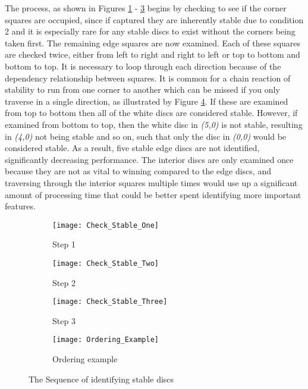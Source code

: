 \documentclass[12pt,a4paper]{article}
\begin{document}
The process, as shown in Figures \ref{fig:order_one} - \ref{fig:order_three} begins by checking to see if the corner squares are occupied, since if captured they are inherently stable due to condition 2 and it is especially rare for any stable discs to exist without the corners being taken first. The remaining edge squares are now examined. Each of these squares are checked twice, either from left to right and right to left or top to bottom and bottom to top. It is necessary to loop through each direction because of the dependency relationship between squares. It is common for a chain reaction of stability to run from one corner to another which can be missed if you only traverse in a single direction, as illustrated by Figure \ref{fig:order_example}. If these are examined from top to bottom then all of the white discs are considered stable. However, if examined from bottom to top, then the white disc in \textit{(5,0)} is not stable, resulting in \textit{(4,0)} not being stable and so on, such that only the disc in \textit{(0,0)} would be considered stable. As a result, five stable edge discs are not identified, significantly decreasing performance.
The interior discs are only examined once because they are not as vital to winning compared to the edge discs, and traversing through the interior squares multiple times would use up a significant amount of processing time that could be better spent identifying more important features.


\begin{figure}[ht]
\centering
\begin{subfigure}{.45\textwidth}
  \centering
  \texttt{[image: Check\_Stable\_One]}
  \caption{Step 1}
  \label{fig:order_one}
\end{subfigure}%
\begin{subfigure}{.45\textwidth}
  \centering
  \texttt{[image: Check\_Stable\_Two]}
  \caption{Step 2}
  \label{fig:order_two}
\end{subfigure}
\begin{subfigure}{.45\textwidth}
  \centering
  \texttt{[image: Check\_Stable\_Three]}
  \caption{Step 3}
  \label{fig:order_three}
\end{subfigure}
\begin{subfigure}{.45\textwidth}
  \centering
  \texttt{[image: Ordering\_Example]}
  \caption{Ordering example}
  \label{fig:order_example}
\end{subfigure}
\caption{The Sequence of identifying stable discs}
\label{fig:check_stability}
\end{figure}
\end{document}
